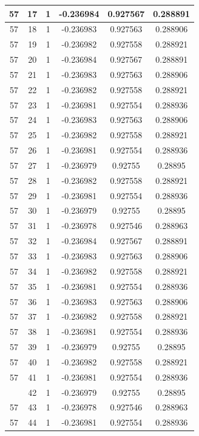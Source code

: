 \documentclass[12pt,a4paper]{article}
\numberwithin{equation}{section}
\numberwithin{figure}{section}
\numberwithin{table}{section}
\begin{document}
\begin{longtable}{|c|c|c|c|c|c|}
57 & 17 & 1 & -0.236984 & 0.927567 & 0.288891 \\ \hline
57 & 18 & 1 & -0.236983 & 0.927563 & 0.288906 \\ \hline
57 & 19 & 1 & -0.236982 & 0.927558 & 0.288921 \\ \hline
57 & 20 & 1 & -0.236984 & 0.927567 & 0.288891 \\ \hline
57 & 21 & 1 & -0.236983 & 0.927563 & 0.288906 \\ \hline
57 & 22 & 1 & -0.236982 & 0.927558 & 0.288921 \\ \hline
57 & 23 & 1 & -0.236981 & 0.927554 & 0.288936 \\ \hline
57 & 24 & 1 & -0.236983 & 0.927563 & 0.288906 \\ \hline
57 & 25 & 1 & -0.236982 & 0.927558 & 0.288921 \\ \hline
57 & 26 & 1 & -0.236981 & 0.927554 & 0.288936 \\ \hline
57 & 27 & 1 & -0.236979 & 0.92755 & 0.28895 \\ \hline
57 & 28 & 1 & -0.236982 & 0.927558 & 0.288921 \\ \hline
57 & 29 & 1 & -0.236981 & 0.927554 & 0.288936 \\ \hline
57 & 30 & 1 & -0.236979 & 0.92755 & 0.28895 \\ \hline
57 & 31 & 1 & -0.236978 & 0.927546 & 0.288963 \\ \hline
57 & 32 & 1 & -0.236984 & 0.927567 & 0.288891 \\ \hline
57 & 33 & 1 & -0.236983 & 0.927563 & 0.288906 \\ \hline
57 & 34 & 1 & -0.236982 & 0.927558 & 0.288921 \\ \hline
57 & 35 & 1 & -0.236981 & 0.927554 & 0.288936 \\ \hline
57 & 36 & 1 & -0.236983 & 0.927563 & 0.288906 \\ \hline
57 & 37 & 1 & -0.236982 & 0.927558 & 0.288921 \\ \hline
57 & 38 & 1 & -0.236981 & 0.927554 & 0.288936 \\ \hline
57 & 39 & 1 & -0.236979 & 0.92755 & 0.28895 \\ \hline
57 & 40 & 1 & -0.236982 & 0.927558 & 0.288921 \\ \hline
57 & 41 & 1 & -0.236981 & 0.927554 & 0.288936 \\ \hline
\pagebreak
57 & 42 & 1 & -0.236979 & 0.92755 & 0.28895 \\ \hline
57 & 43 & 1 & -0.236978 & 0.927546 & 0.288963 \\ \hline
57 & 44 & 1 & -0.236981 & 0.927554 & 0.288936 \\ \hline

\end{longtable}
\end{document}

